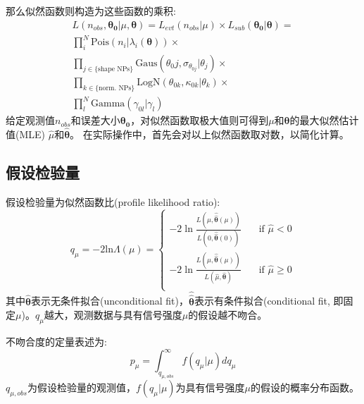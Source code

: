 那么似然函数则构造为这些函数的乘积:
\begin{equation}
\begin{aligned}
 L(n_{obs},\boldsymbol{\theta_0}|\mu,\boldsymbol{\theta})=L_{evt}(n_{obs}|\mu)\times L_{sub}(\boldsymbol{\theta_0}|\boldsymbol{\theta})=\\
 \prod_i^N\text{Pois}(n_i|\lambda_i(\boldsymbol{\theta}))\times \\
 \prod_{j\in\{\text{shape NPs}\}}\text{Gaus}(\theta_0j,\sigma_{\theta_{0j}}|\theta_j)\times \\
 \prod_{k\in\{\text{norm. NPs}\}}\text{LogN}(\theta_{0k},\kappa_{0k}|\theta_k)\times \\
 \prod_l^N\text{Gamma}(\gamma_{0l}|\gamma_l)
\end{aligned}
\end{equation}
给定观测值$n_{obs}$和误差大小$\boldsymbol{\theta_0}$，对似然函数取极大值则可得到$\mu$和$\boldsymbol{\theta}$的最大似然估计值(MLE) $\hat{\mu}$和$\hat{\boldsymbol{\theta}}$。
在实际操作中，首先会对以上似然函数取对数，以简化计算。

\subsection{假设检验量}
假设检验量为似然函数比(profile likelihood ratio):
\begin{equation}
\label{eq:test_statistic}
 q_\mu = -2\text{ln}\Lambda(\mu)=
  \begin{cases}
    -2 \ln \frac{L(\mu,\hat{\hat{\boldsymbol{\theta}}}(\mu))}{L(0,\hat{\hat{\boldsymbol{\theta}}}(0))} & \quad \text{if $\hat\mu < 0$}\\
    -2 \ln \frac{L(\mu,\hat{\hat{\boldsymbol{\theta}}}(\mu))}{L(\hat{\mu},\hat{\boldsymbol{\theta}})} & \quad \text{if $\hat\mu \geq 0$}\\
  \end{cases}
 \end{equation}
 \noindent 其中$\hat{\boldsymbol{\theta}}$表示无条件拟合(unconditional fit)，$\hat{\hat{\boldsymbol{\theta}}}$表示有条件拟合(conditional fit, 即固定$\mu$)。$q_ \mu$越大，观测数据与具有信号强度$\mu$的假设越不吻合。
 
 不吻合度的定量表述为:
 \begin{equation}
  p_ \mu=\int_{q_{\mu, obs}}^{\infty}f(q_ \mu|\mu)dq_ \mu
 \end{equation}
 $q_{\mu, obs}$为假设检验量的观测值，$f(q_ \mu|\mu)$为具有信号强度$\mu$的假设的概率分布函数。
 
